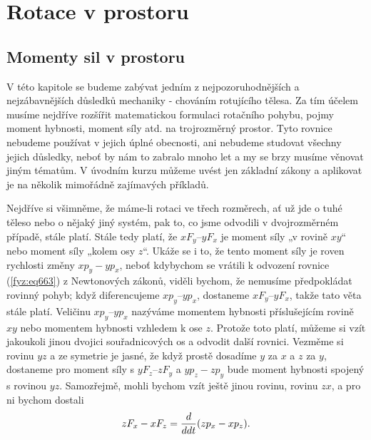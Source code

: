 \setchaptertoc
\chapter{Rotace v prostoru}\label{fyz:IchapXX}
  \section{Momenty sil v prostoru}\label{fyz:IchapXXsecI}
    V této kapitole se budeme zabývat jedním z nejpozoruhodnějších a nejzábavnějších důsledků
    mechaniky - chováním rotujícího tělesa. Za tím účelem musíme nejdříve rozšířit matematickou
    formulaci rotačního pohybu, pojmy moment hybnosti, moment síly atd. na trojrozměrný prostor.
    Tyto rovnice nebudeme používat v jejich úplné obecnosti, ani nebudeme studovat všechny jejich
    důsledky, neboť by nám to zabralo mnoho let a my se brzy musíme věnovat jiným tématům. V úvodním
    kurzu můžeme uvést jen základní zákony a aplikovat je na několik mimořádně zajímavých příkladů.

    Nejdříve si všimněme, že máme-li rotaci ve třech rozměrech, ať už jde o tuhé těleso nebo o
    nějaký jiný systém, pak to, co jsme odvodili v dvojrozměrném případě, stále platí. Stále tedy
    platí, že \(xF_y – yF_x\) je moment síly „v rovině \(xy\)“ nebo moment síly „kolem osy \(z\)“.
    Ukáže se i to, že tento moment síly je roven rychlosti změny \(xp_y - yp_x\), neboť kdybychom se
    vrátili k odvození rovnice (\ref{fyz:eq663}) z Newtonových zákonů, viděli bychom, že nemusíme
    předpokládat rovinný pohyb; když diferencujeme \(xp_y – yp_x\), dostaneme \(xF_y – yF_x\), takže
    tato věta stále platí. Veličinu \(xp_y – yp_x\) nazýváme momentem hybnosti příslušejícím rovině
    \(xy\) nebo momentem hybnosti vzhledem k ose \(z\). Protože toto platí, můžeme si vzít jakoukoli
    jinou dvojici souřadnicových os a odvodit další rovnici. Vezměme si rovinu \(yz\) a ze symetrie
    je jasné, že když prostě dosadíme \(y\) za \(x\) a \(z\) za \(y\), dostaneme pro moment síly s
    \(yF_z –  zF_y\) a \(yp_z-zp_y\) bude moment hybnosti spojený s rovinou \(yz\). Samozřejmě,
    mohli bychom vzít ještě jinou rovinu, rovinu \(zx\), a pro ni bychom dostali
    \begin{equation*}
      zF_x - xF_z = \dfrac{d  }{d dt}(zp_x - xp_z).
    \end{equation*}

